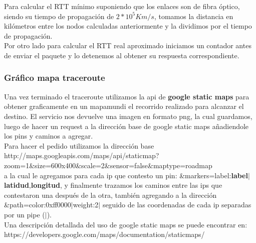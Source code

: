 Para calcular el RTT mínimo suponiendo que los enlaces son de fibra óptico, siendo su tiempo de propagación de $2*10^{5}Km/s$, tomamos la distancia en kilómetros entre los nodos calculadas anteriormente y la dividimos por el tiempo de propagación.	\\
\indent Por otro lado para calcular el RTT real aproximado iniciamos un contador antes de enviar el paquete y lo detenemos al obtener su respuesta correspondiente.

\subsubsection{Gráfico mapa traceroute}

Una vez terminado el traceroute utilizamos la api de \textbf{google static maps} para obtener graficamente en un mapamundi el recorrido realizado para alcanzar el destino. El servicio nos devuelve una imagen en formato png, la cual guardamos, luego de hacer un request a la dirección base de google static maps añadiendole los pins y caminos a agregar.	\\
\indent	Para hacer el pedido utilizamos la dirección base \\http://maps.googleapis.com/maps/api/staticmap?zoom=1\&size=600x400\&scale=2\&sensor=false\&maptype=roadmap	\\
 a la cual le agregamos para cada ip que contesto un pin: \&markers=label:\textbf{label}$|$\textbf{latidud},\textbf{longitud}, y finalmente trazamos los caminos entre las ips que contestaron una después de la otra, también agregando a la dirección \\ \&path=color:0xff0000$|$weight:2$|$ seguido de las coordenadas de cada ip separadas por un pipe ($|$).	\\
\indent Una descripción detallada del uso de google static maps se puede encontrar en: \\ https://developers.google.com/maps/documentation/staticmaps/
